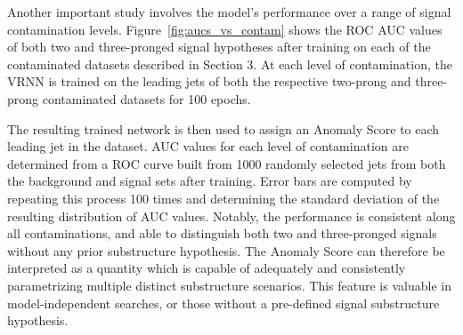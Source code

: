 \documentclass[11pt, a4paper]{article}
\begin{document}



Another important study involves the model's performance over a range of signal contamination
levels. Figure~\ref{fig:aucs_vs_contam} shows the ROC AUC values of both two and three-pronged signal hypotheses
after training on each of the contaminated datasets described in Section 3. 
At each level of contamination, the VRNN is trained on the leading jets of both the respective two-prong and three-prong contaminated datasets for 100 epochs. 

The resulting trained network is then used to assign an Anomaly Score to each leading jet in the dataset. 
AUC values for each level of contamination are determined from a ROC curve built from 1000 randomly selected jets from both the background and signal sets after training.
Error bars are computed by repeating this process 100 times and determining the standard deviation of the resulting distribution of AUC values.
Notably, the performance is consistent along all contaminations, and able to distinguish both two and three-pronged signals without any prior substructure hypothesis. 
The Anomaly Score can therefore be interpreted as a quantity which is capable of adequately and consistently parametrizing multiple distinct substructure scenarios. 
This feature is valuable in model-independent searches, or those without a pre-defined signal substructure hypothesis. 
\end{document}
